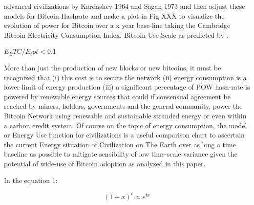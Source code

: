 \documentclass[final,5p,times,twocolumn,authoryear]{elsarticle}
\begin{document}
advanced civilizations by Kardashev 1964 and Sagan 1973 and then adjust these models for Bitcoin Hashrate and make a plot in Fig XXX to visualize the evolution of power for Bitcoin over a x year base-line taking the Cambridge Bitcoin Electricity Consumption Index, Bitcoin Use Scale as predicted by . 

$E_BTC/E_tot < 0.1$

More than just the production of new blocks or new bitcoins, it must be recognized that (i) this cost is to secure the network (ii) energy consumption is a lower limit of energy production (iii) a significant percentage of POW hash-rate is powered by renewable energy sources that could if consensual agreement be reached by miners,  holders, governments and the general community, power the Bitcoin Network using renewable and sustainable stranded energy or even within a carbon credit system. Of course on the topic of energy consumption, the \cite{kar64} model or Energy Use function for civilizations is a useful comparison chart to ascertain the current Energy situation of Civilization on The Earth over as long a time baseline as possible to mitigate sensibility of low time-scale variance given the potential of wide-use of Bitcoin adoption as analyzed in this paper.

In the \cite{kar64} equation 1:

\begin{equation}
    (1+x)^t \approx e^{tx}
\end{equation}
\end{document}

